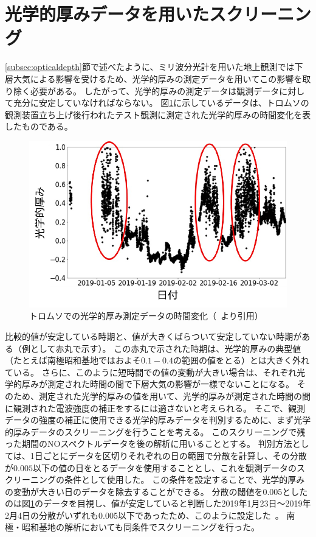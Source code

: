 \section{光学的厚みデータを用いたスクリーニング}
\label{sec:screening_opticaldepth}
\ref{subsec:opticaldepth}節で述べたように、ミリ波分光計を用いた地上観測では下層大気による影響を受けるため、光学的厚みの測定データを用いてこの影響を取り除く必要がある。
したがって、光学的厚みの測定データは観測データに対して充分に安定していなければならない。
図\ref{fig:optical_depth_tromsoe}に示しているデータは、トロムソの観測装置立ち上げ後行われたテスト観測に測定された光学的厚みの時間変化を表したものである。
\begin{figure}[htbp]
    \centering
    \includegraphics[width=\linewidth]{master_thesis_contents/master_thesis_fig/optical_depth_tromsoe.pdf}
    \caption{トロムソでの光学的厚み測定データの時間変化（~\cite{goto2021bachelor}より引用）}
    \label{fig:optical_depth_tromsoe}
\end{figure}
比較的値が安定している時期と、値が大きくばらついて安定していない時期がある（例として赤丸で示す）。
この赤丸で示された時期は、光学的厚みの典型値（たとえば南極昭和基地ではおよそ$0.1-0.4$の範囲の値をとる）とは大きく外れている。
さらに、このように短時間での値の変動が大きい場合は、それぞれ光学的厚みが測定された時間の間で下層大気の影響が一様でないことになる。
そのため、測定された光学的厚みの値を用いて、光学的厚みが測定された時間の間に観測された電波強度の補正をするには適さないと考えられる。
そこで、観測データの強度の補正に使用できる光学的厚みデータを判別するために、まず光学的厚みデータのスクリーニングを行うことを考える。
このスクリーニングで残った期間のNOスペクトルデータを後の解析に用いることとする。
判別方法としては、1日ごとにデータを区切りそれぞれの日の範囲で分散を計算し、その分散が$0.005$以下の値の日をとるデータを使用することとし、これを観測データのスクリーニングの条件として使用した。
この条件を設定することで、光学的厚みの変動が大きい日のデータを除去することができる。
分散の閾値を0.005としたのは図\ref{fig:optical_depth_tromsoe}のデータを目視し、値が安定していると判断した2019年1月23日〜2019年2月4日の分散がいずれも0.005以下であったため、このように設定した~\cite{goto2021bachelor}。
南極・昭和基地の解析においても同条件でスクリーニングを行った。


